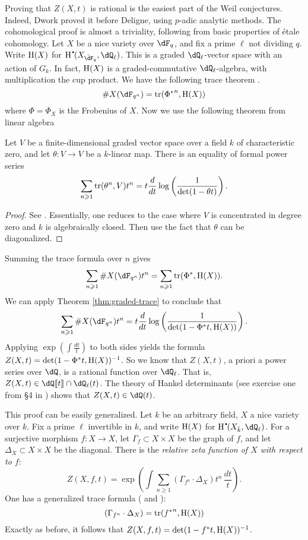 Proving that $Z(X,t)$ is rational is the easiest part of the Weil conjectures. 
Indeed, Dwork proved it before Deligne, using $p$-adic analytic methods. The 
cohomological proof is almost a triviality, following from basic properties of 
\'etale cohomology. Let $X$ be a nice variety over $\dF_q$, and fix a prime 
$\ell$ not dividing $q$. Write $\operatorname{H}(X)$ for 
$\h^\bullet(X_{\bar\dF_q},\dQ_\ell)$. This is a graded $\dQ_\ell$-vector space 
with an action of $G_k$. In fact, $\operatorname{H}(X)$ is a graded-commutative 
$\dQ_\ell$-algebra, with multiplication the cup product. We have the following 
trace theorem \cite[II.3.1]{de77}. 
\[
  \# X(\dF_{q^n}) = \trace({\Phi^\ast}^n,\h(X)) 
\]
where $\Phi=\Phi_X$ is the Frobenius of $X$. Now we use the following theorem 
from linear algebra

\begin{theorem}\label{thm:graded-trace}
Let $V$ be a finite-dimensional graded vector space over a field $k$ of 
characteristic zero, and let $\theta:V\to V$ be a $k$-linear map. There is an 
equality of formal power series 
\[
  \sum_{n\geqslant 1} \operatorname{tr}(\theta^n, V) t^n = t\frac{d}{dt} \log\left(\frac{1}{\det(1-\theta t)}\right) \text{.}
\]
\end{theorem}
\begin{proof}
See \cite[II.3.3]{de77}. Essentially, one reduces to the case where $V$ 
is concentrated in degree zero and $k$ is algebraically closed. Then use 
the fact that $\theta$ can be diagonalized. 
\end{proof}

Summing the trace formula over $n$ gives 
\[
  \sum_{n\geqslant 1} \# X(\dF_{q^n}) t^n = \sum_{n\geqslant 1} \trace({\Phi^\ast}, \h(X)) \text{.}
\]
We can apply Theorem \ref{thm:graded-trace} to conclude that 
\[
  \sum_{n\geqslant 1} \# X(\dF_{q^n}) t^n =  t\frac{d}{dt} \log\left(\frac{1}{\det(1-\Phi^\ast t, \h(X))}\right) \text{.}
\]
Applying $\exp\left(\int \frac{dt}{t}\right)$ to both sides yields the formula 
$Z(X,t) = \det(1-\Phi^\ast t,\operatorname{H}(X))^{-1}$. So we know that 
$Z(X,t)$, a priori a power series over $\dQ$, is a rational function over 
$\dQ_\ell$. That is, $Z(X,t)\in \dQ\llbracket t\rrbracket \cap \dQ_\ell(t)$. 
The theory of Hankel determinants (see exercise one from \S 4 in 
\cite[A.IV]{bo90}) shows that $Z(X,t)\in \dQ(t)$. 

This proof can be easily generalized. Let $k$ be an arbitrary field, $X$ a nice 
variety over $k$. Fix a prime $\ell$ invertible in $k$, and write 
$\operatorname{H}(X)$ for $\h^\bullet(X_{\bar k},\dQ_\ell)$. For a surjective morphism 
$f:X\to X$, let $\Gamma_f\subset X\times X$ be the graph of $f$, and let 
$\Delta_X\subset X\times X$ be the diagonal. There is the \emph{relative zeta 
function of $X$ with respect to $f$}: 
\[
  Z(X,f,t) = \exp\left(\int \sum_{n\geqslant 1} (\Gamma_{f^n}\cdot \Delta_X) t^n\,\frac{dt}{t}\right) \text{.}
\]
One has a generalized trace formula (\cite[ex.11]{dj-wc} and \cite[IV.3.3]{de77}):
\[
  (\Gamma_{f^n}\cdot \Delta_X) = \operatorname{tr}({f^\ast}^n, \operatorname{H}(X))
\]
Exactly as before, it follows that $Z(X,f,t) = \det(1-f^\ast t,\operatorname{H}(X))^{-1}$. 

